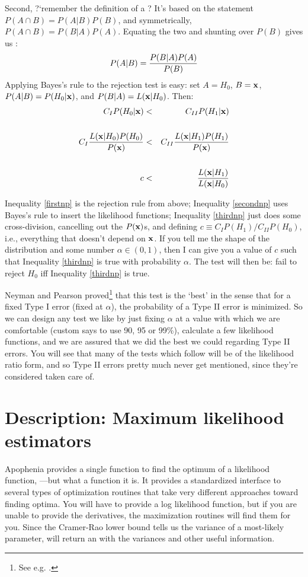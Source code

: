 Second, ?`remember the definition of a ? It's based on the
statement $P(A\cap B)=P(A|B)P(B)$, and symmetrically, $P(A\cap B)=P(B|A)P(A)$.  Equating
the two and shunting over $P(B)$ gives us : $$P(A|B)={P(B|A) P(A)\over P(B)}$$
Applying Bayes's rule to the rejection test is easy: set $A=H_0$, $B={\bf x}$,
$P(A|B)=P(H_0|{\bf x})$, and $P(B|A)=L({\bf x}|H_0)$. Then:
\begin{align}
C_I P(H_0|{\bf x})&<&C_{II} P(H_1|{\bf x})\label{firstnp}\\
\nonumber\\
C_I {L({\bf x}|H_0)P(H_0)\over P({\bf x})}&<& C_{II} {L({\bf x}|H_1)P(H_1)\over P({\bf x})}\label{secondnp}\\
\nonumber\\
c&<& {L({\bf x}|H_1)\over L({\bf x}|H_0)}\label{thirdnp}
\end{align}

Inequality \ref{firstnp} is the rejection rule from above; Inequality
\ref{secondnp} uses Bayes's rule to insert the likelihood functions;
Inequality \ref{thirdnp} just does some cross-division, cancelling out the
$P({\bf x})$s, and defining $c\equiv C_IP(H_1)/C_{II}P(H_0)$, i.e., everything
that doesn't depend on ${\bf x}$. If you tell me the shape of the distribution
and some number $\alpha\in(0,1)$, then I can give you a value of $c$
such that Inequality \ref{thirdnp} is true with probability
$\alpha$. The test will then be: fail to reject $H_0$ iff Inequality
\ref{thirdnp} is true.

Neyman and Pearson proved\footnote{See
e.g. \citet[189--191]{amemiya:ez}.}
that this test is the `best' in the sense that for a
fixed Type I error (fixed at $\alpha$), the probability of a Type II
error is minimized. So we can design any test we like by just fixing $\alpha$
at a value with which we are comfortable (custom says to use
90, 95 or 99\%), calculate a few likelihood functions, and we are assured
that we did the best we could regarding Type II errors. You will see that
many of the tests which follow will be of the likelihood ratio form,
and so Type II errors pretty much never get mentioned, since they're
considered taken care of.

\section{Description: Maximum likelihood estimators} 
Apophenia provides a single function to find the optimum of a likelihood
function, ---but what a function it is. It
provides a standardized interface to several types of optimization
routines that take very different approaches toward finding optima. You
will have to provide a log likelihood function, but if you are unable to
provide the derivatives, the maximization routines will find them for
you. Since the Cramer-Rao lower bound tells us the variance of a
most-likely parameter,  will return an
 with the variances and other useful information.


